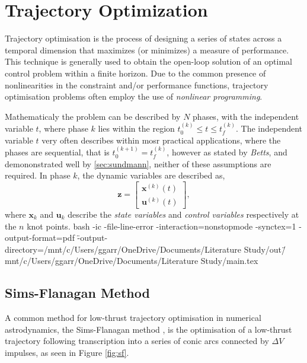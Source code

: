 \chapter{Trajectory Optimization}
Trajectory optimisation is the process of designing a series of states across a
temporal dimension that maximizes (or minimizes) a measure of performance. This
technique is generally used to obtain the open-loop solution of an optimal
control problem within a finite horizon. Due to the common presence of
nonlinearities in the constraint and/or performance functions, trajectory
optimisation problems often employ the use of \textit{nonlinear programming}.

Mathematicaly the problem can be described by $N$ phases, with the independent
variable $t$, where phase $k$ lies within the region
$t_0^{(k)}\leq{t}\leq{t_f^{(k)}}$. The independent variable $t$ very often
describes  within mosr practical applications, where the phases are
sequential, that is $t_0^{(k+1)}=t_f^{(k)}$, however as stated by
\textit{Betts}, and demononstrated well by \autoref{sec:sundmann}, neither of
these assumptions are required. In phase $k$, the dynamic variables are
described as,
\begin{equation}
  \mathbf{z}=
  \begin{bmatrix}
  \mathbf{x}^{(k)}(t) \\
  \mathbf{u}^{(k)}(t)
  \end{bmatrix},
\end{equation}
where $\mathbf{x}_k$ and $\mathbf{u}_k$ describe the \textit{state variables}
and \textit{control variables} respectively at the $n$ knot points.
bash -ic \usr\bin\pdflatex -file-line-error -interaction=nonstopmode -synctex=1 -output-format=pdf \"-output-directory=/mnt/c/Users/ggarr/OneDrive/Documents/Literature Study/out\" /mnt/c/Users/ggarr/OneDrive/Documents/Literature Study/main.tex

\section{Sims-Flanagan Method}
A common method for low-thrust trajectory optimisation in numerical
astrodynamics, the Sims-Flanagan method \cite{Sims2000}, is the optimisation of
a low-thrust trajectory following transcription into a series of conic arcs
connected by $\Delta{V}$ impulses, as seen in Figure \autoref{fig:sf}.

